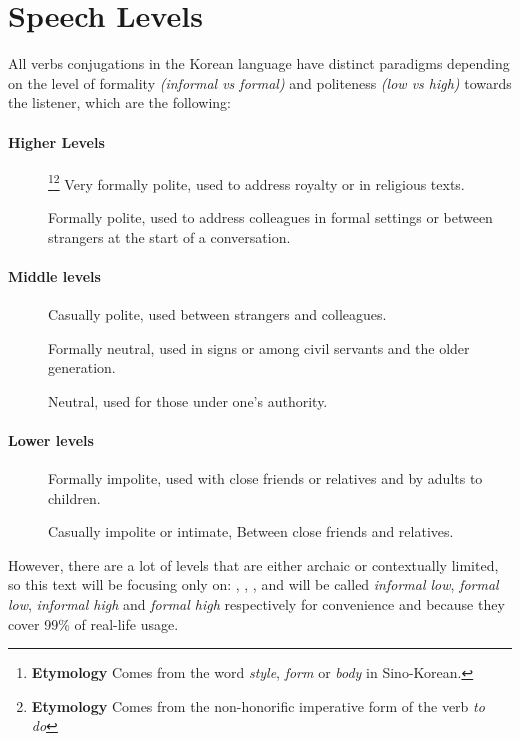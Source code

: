 \section{Speech Levels}
All verbs conjugations in the Korean language have distinct paradigms depending on the level of formality \textit{(informal vs formal)} and politeness \textit{(low vs high)} towards the listener, which are the following:

\paragraph{Higher Levels}
\begin{description}
    \item[]\footnote{\textbf{Etymology} Comes from the word \textit{style}, \textit{form} or \textit{body} in Sino-Korean.}\footnote{\textbf{Etymology}  Comes from the non-honorific imperative form of the verb \textit{to do} } Very formally polite, used to address royalty or in religious texts.
    \item[] Formally polite, used to address colleagues in formal settings or between strangers at the start of a conversation.
\end{description}

\paragraph{Middle levels}
\begin{description}
    \item [] Casually polite, used between strangers and colleagues.
    \item [] Formally neutral, used in signs or among civil servants and the older generation.
    \item [] Neutral, used for those under one's authority.
\end{description}

\paragraph{Lower levels}
\begin{description}
    \item [] Formally impolite, used with close friends or relatives and by adults to children.
    \item [] Casually impolite or intimate, Between close friends and relatives.
\end{description}

However, there are a lot of levels that are either archaic or contextually limited, so this text will be focusing only on: , , ,  and will be called \textit{informal low}, \textit{formal low}, \textit{informal high} and \textit{formal high} respectively for convenience and because they cover 99\% of real-life usage.